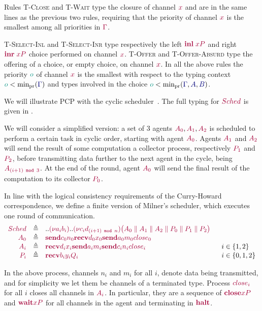 \documentclass[main.tex]{subfiles}
\begin{document}
Rules \textsc{T-Close} and \textsc{T-Wait} type the closure of channel $\tm x$ and are in the same lines as the previous two rules, requiring that the priority of channel $\tm x$ is the smallest among all priorities in $\tm\Gamma$.

\textsc{T-Select-Inl} and \textsc{T-Select-Inr} type respectively the left $\tm{\inl{x}{P}}$ and right $\tm{\inr{x}{P}}$ choice performed on channel $\tm x$. \textsc{T-Offer} and \textsc{T-Offer-Absurd} type the offering of a choice, or empty choice, on channel $\tm x$. In all the above rules the priority $\cs o$ of channel $\tm x$ is the smallest with respect to the typing context $\cs{o}<\minpr(\ty{\Gamma})$ and types involved in the choice $\cs{o}<\minpr(\ty{\Gamma},\ty{A},\ty{B})$.


\begin{example}
  We will illustrate PCP with the cyclic scheduler~\cite{milner89}. The full typing for $\tm {Sched}$ is given in \cite{dardhagay18}.

  We will consider a simplified version: a set of 3 agents $\tm {A_0}, \tm {A_1}, \tm {A_2}$ is scheduled to perform a certain task in cyclic order, starting with agent $\tm {A_0}$. Agents $\tm {A_1}$ and $\tm {A_2}$ will send the result of some computation a collector process, respectively $\tm {P_1}$ and $\tm {P_2}$, before transmitting data further to the next agent in the cycle, being $\tm {A_{(i+1)\texttt{ mod } 3}}$. At the end of the round, agent $\tm {A_0}$ will send the final result of the computation to its collector $\tm {P_0}$.

  In line with the logical consistency requirements of the Curry-Howard correspondence, we define a finite version of Milner's scheduler, which executes one round of communication.
  $$
    \begin{array}{rcll}
      \tm {Sched} & \defeq & ..\tm {(\nu {a_i}{b_i})}..\tm {(\nu {c_i}{d_{{(i+1)\texttt{ mod } n}}})} \tm {\big(A_0 \parallel A_1 \parallel A_2 \parallel P_0 \parallel P_1 \parallel P_2 \big)}\\
      \tm{A_0} & \defeq & \tm{\send{c_0}{n_0}{\recv{d_0}{x_0}{\send{a_0}{m_0}{close_0}}}}\\
      \tm{A_i} & \defeq & \tm{\recv{d_i}{x_i}{\send{a_i}{m_i}{\send{c_i}{n_i}{close_i}}}} &~~ i \in \{1,2\}\\
      \tm {P_i} & \defeq & \tm{\recv{b_i}{y_i}{Q_i}} &~~ i \in \{0,1,2\}
    \end{array}
  $$

  In the above process, channels $n_i$ and $m_i$ for all $i$, denote data being transmitted, and for simplicity we let them be channels of a terminated type. Process $\tm{close_i}$ for all $i$ closes all channels in $\tm{A_i}$. In particular, they are a sequence of $\tm{\close{x}{P}}$ and $\tm{\wait{x}{P}}$ for all channels in the agent and terminating in $\tm{\halt}$.
\end{example}
\end{document}
